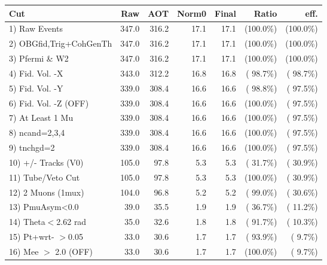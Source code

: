  \begin{table}[h!]\centering
 \begin{tabular}{||l||r|r|r|r|r|r||}
 \hline
 \hline
 Cut & Raw & AOT & Norm0 & Final & Ratio & eff.       \\
 \hline
  1) Raw Events           &        347.0 &        316.2 &         17.1 &         17.1 & (100.0\%) & (100.0\%) \\
  2) OBGfid,Trig+CohGenTh &        347.0 &        316.2 &         17.1 &         17.1 & (100.0\%) & (100.0\%) \\
  3) Pfermi \& W2         &        347.0 &        316.2 &         17.1 &         17.1 & (100.0\%) & (100.0\%) \\
  4) Fid. Vol. -X         &        343.0 &        312.2 &         16.8 &         16.8 & ( 98.7\%) & ( 98.7\%) \\
  5) Fid. Vol. -Y         &        339.0 &        308.4 &         16.6 &         16.6 & ( 98.8\%) & ( 97.5\%) \\
  6) Fid. Vol. -Z (OFF)   &        339.0 &        308.4 &         16.6 &         16.6 & (100.0\%) & ( 97.5\%) \\
  7) At Least 1 Mu        &        339.0 &        308.4 &         16.6 &         16.6 & (100.0\%) & ( 97.5\%) \\
  8) ncand=2,3,4          &        339.0 &        308.4 &         16.6 &         16.6 & (100.0\%) & ( 97.5\%) \\
  9) tnchgd=2             &        339.0 &        308.4 &         16.6 &         16.6 & (100.0\%) & ( 97.5\%) \\
 10) +/- Tracks (V0)      &        105.0 &         97.8 &          5.3 &          5.3 & ( 31.7\%) & ( 30.9\%) \\
 11) Tube/Veto Cut        &        105.0 &         97.8 &          5.3 &          5.3 & (100.0\%) & ( 30.9\%) \\
 12) 2 Muons (1mux)       &        104.0 &         96.8 &          5.2 &          5.2 & ( 99.0\%) & ( 30.6\%) \\
 13) PmuAsym<0.0          &         39.0 &         35.5 &          1.9 &          1.9 & ( 36.7\%) & ( 11.2\%) \\
 14) Theta$<$2.62 rad     &         35.0 &         32.6 &          1.8 &          1.8 & ( 91.7\%) & ( 10.3\%) \\
 15) Pt+wrt- $>$0.05      &         33.0 &         30.6 &          1.7 &          1.7 & ( 93.9\%) & (  9.7\%) \\
 16) Mee $>$ 2.0  (OFF)   &         33.0 &         30.6 &          1.7 &          1.7 & (100.0\%) & (  9.7\%) \\

\end{tabular}
\end{table}
